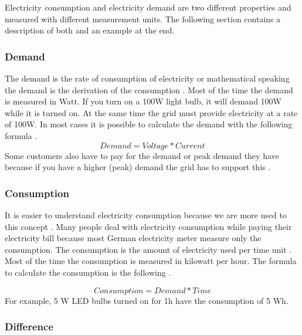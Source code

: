 Electricity consumption and electricity demand are two different properties and measured with different measurement units.
The following section contains a description of both and an example at the end.

\subsubsection{Demand}

The demand is the rate of consumption of electricity or mathematical speaking the demand is the derivation of the consumption \cite{StonyBrookUniversity}.
Most of the time the demand is measured in Watt. If you turn on a 100W light bulb, it will demand 100W while it is turned on. At the same time the grid must provide electricity at a rate of 100W. In most cases it is possible to calculate the demand with the following formula \cite{Eggenberger}.
\begin{equation*}
	Demand = Voltage * Current
\end{equation*}
Some customers also have to pay for the demand or peak demand they have because if you have a higher (peak) demand the grid has to support this \cite{StonyBrookUniversity}\cite{enertiv}.  %


\subsubsection{Consumption}

It is easier to understand electricity consumption because we are more used to this concept \cite{StonyBrookUniversity}. Many people deal with electricity consumption while paying their electricity bill because most German electricity meter measure only the consumption. %
The consumption is the amount of electricity used per time unit \cite{StonyBrookUniversity}\cite{enertiv}. Most of the time the consumption is measured in kilowatt per hour.
The formula to calculate the consumption is the following \cite{StonyBrookUniversity}. %

\begin{equation*}
	Consumption = Demand * Time
\end{equation*}
For example, 5 W LED bulbs turned on for 1h have the consumption of 5 Wh.

\subsubsection{Difference}

